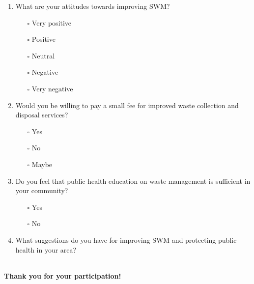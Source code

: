 \begin{enumerate}[label=\arabic*., start=13]
    \item What are your attitudes towards improving SWM?
    \begin{itemize}
        \item[$\square$] Very positive
        \item[$\square$] Positive
        \item[$\square$] Neutral
        \item[$\square$] Negative
        \item[$\square$] Very negative
    \end{itemize}

    \item Would you be willing to pay a small fee for improved waste collection and disposal services?
    \begin{itemize}
        \item[$\square$] Yes
        \item[$\square$] No
        \item[$\square$] Maybe
    \end{itemize}

    \item Do you feel that public health education on waste management is sufficient in your community?
    \begin{itemize}
        \item[$\square$] Yes
        \item[$\square$] No
    \end{itemize}

    \item What suggestions do you have for improving SWM and protecting public health in your area? \\
    \vspace{1em}\hrulefill \\[1em]
    \hrulefill
\end{enumerate}

\bigskip
\textbf{Thank you for your participation!}

